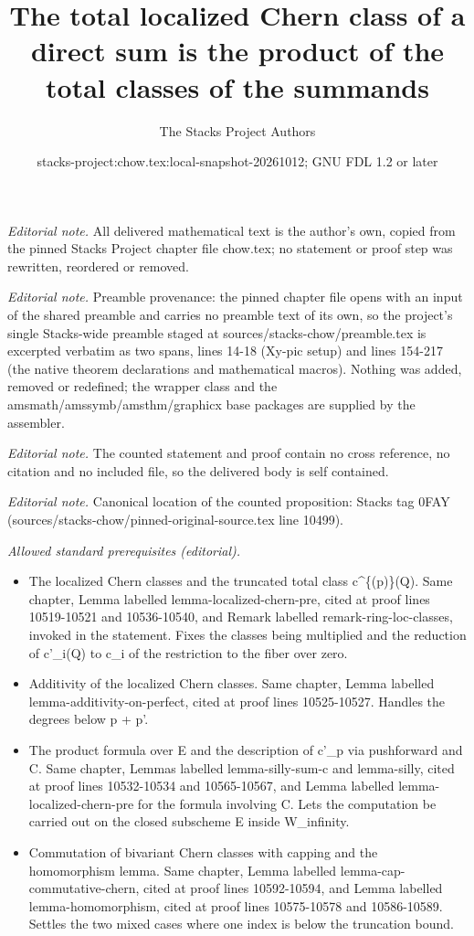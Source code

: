 \documentclass[10pt,a4paper]{amsart}
\title{The total localized Chern class of a direct sum is the product of the total classes of the summands}
\author{The Stacks Project Authors}
\date{stacks-project:chow.tex:local-snapshot-20261012; GNU FDL 1.2 or later}
\theoremstyle{plain}
\theoremstyle{definition}
\theoremstyle{remark}
\numberwithin{equation}{subsection}
\begin{document}
\maketitle
\noindent\textit{Editorial note.} All delivered mathematical text is the author's own, copied from the pinned Stacks Project chapter file chow.tex; no statement or proof step was rewritten, reordered or removed.\par\medskip
\noindent\textit{Editorial note.} Preamble provenance: the pinned chapter file opens with an input of the shared preamble and carries no preamble text of its own, so the project's single Stacks-wide preamble staged at sources/stacks-chow/preamble.tex is excerpted verbatim as two spans, lines 14-18 (Xy-pic setup) and lines 154-217 (the native theorem declarations and mathematical macros). Nothing was added, removed or redefined; the wrapper class and the amsmath/amssymb/amsthm/graphicx base packages are supplied by the assembler.\par\medskip
\noindent\textit{Editorial note.} The counted statement and proof contain no cross reference, no citation and no included file, so the delivered body is self contained.\par\medskip
\noindent\textit{Editorial note.} Canonical location of the counted proposition: Stacks tag 0FAY (sources/stacks-chow/pinned-original-source.tex line 10499).\par\medskip
\noindent\textit{Allowed standard prerequisites (editorial).}\begin{itemize}
\item The localized Chern classes and the truncated total class c\textasciicircum{}\{(p)\}(Q). Same chapter, Lemma labelled lemma-localized-chern-pre, cited at proof lines 10519-10521 and 10536-10540, and Remark labelled remark-ring-loc-classes, invoked in the statement. Fixes the classes being multiplied and the reduction of c'\_i(Q) to c\_i of the restriction to the fiber over zero.
\item Additivity of the localized Chern classes. Same chapter, Lemma labelled lemma-additivity-on-perfect, cited at proof lines 10525-10527. Handles the degrees below p + p'.
\item The product formula over E and the description of c'\_p via pushforward and C. Same chapter, Lemmas labelled lemma-silly-sum-c and lemma-silly, cited at proof lines 10532-10534 and 10565-10567, and Lemma labelled lemma-localized-chern-pre for the formula involving C. Lets the computation be carried out on the closed subscheme E inside W\_infinity.
\item Commutation of bivariant Chern classes with capping and the homomorphism lemma. Same chapter, Lemma labelled lemma-cap-commutative-chern, cited at proof lines 10592-10594, and Lemma labelled lemma-homomorphism, cited at proof lines 10575-10578 and 10586-10589. Settles the two mixed cases where one index is below the truncation bound.
\end{itemize}\medskip
\end{document}
